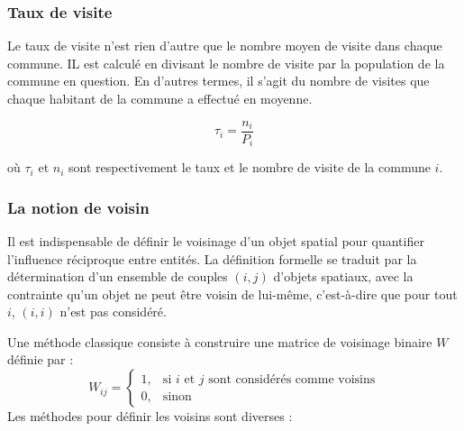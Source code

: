 \documentclass[
]{article}
\begin{document}
\hypertarget{taux-de-visite}{%
\subsubsection{Taux de visite}\label{taux-de-visite}}

Le taux de visite n'est rien d'autre que le nombre moyen de visite dans
chaque commune. IL est calculé en divisant le nombre de visite par la
population de la commune en question. En d'autres termes, il s'agit du
nombre de visites que chaque habitant de la commune a effectué en
moyenne.

\[\tau_i = \frac{n_i}{P_i}\]

où \(\tau_i\) et \(n_i\) sont respectivement le taux et le nombre de
visite de la commune \(i\).

\hypertarget{la-notion-de-voisin}{%
\subsubsection{La notion de voisin}\label{la-notion-de-voisin}}

Il est indispensable de définir le voisinage d'un objet spatial pour
quantifier l'influence réciproque entre entités. La définition formelle
se traduit par la détermination d'un ensemble de couples \((i,j)\)
d'objets spatiaux, avec la contrainte qu'un objet ne peut être voisin de
lui-même, c'est-à-dire que pour tout \(i\), \((i,i)\) n'est pas
considéré.

Une méthode classique consiste à construire une matrice de voisinage
binaire \(W\) définie par : \[
W_{ij} = \begin{cases} 
1, & \text{si } i \text{ et } j \text{ sont considérés comme voisins} \\
0, & \text{sinon}
\end{cases}
\] Les méthodes pour définir les voisins sont diverses :
\end{document}

